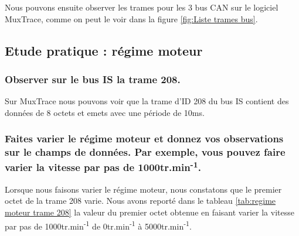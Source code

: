 \documentclass{rapportECC}
\begin{document}

Nous pouvons ensuite observer les trames pour les 3 bus CAN sur le logiciel MuxTrace, comme on peut le voir dans la figure \ref{fig:Liste trames bus}.



\subsection{Etude pratique : régime moteur}

\subsubsection*{Observer sur le bus IS la trame 208.}

Sur MuxTrace nous pouvons voir que la trame d'ID 208 du bus IS contient des données de 8 octets et emets avec une période de 10ms.

\subsubsection*{Faites varier le régime moteur et donnez vos observations sur le champs de données. Par exemple, vous pouvez faire varier la vitesse par pas de 1000tr.min\textsuperscript{-1}.}

Lorsque nous faisons varier le régime moteur, nous constatons que le premier octet de la trame 208 varie. Nous avons reporté dans le tableau \ref{tab:regime moteur trame 208} la valeur du premier octet obtenue en faisant varier la vitesse par pas de 1000tr.min\textsuperscript{-1} de 0tr.min\textsuperscript{-1} à 5000tr.min\textsuperscript{-1}.
\end{document}
